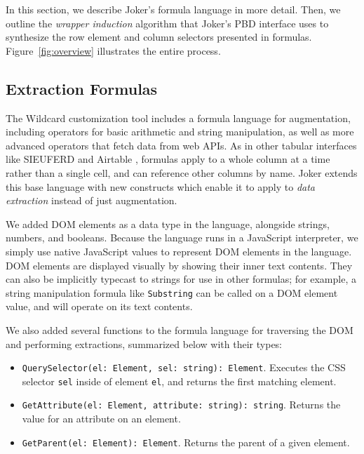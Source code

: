 \documentclass[conference]{IEEEtran}
\providecommand{\tightlist}{%
  \setlength{\itemsep}{0pt}\setlength{\parskip}{0pt}}
\begin{document}
In this section, we describe Joker's formula language in more detail.
Then, we outline the \emph{wrapper induction} \citep{kushmerick2000}
algorithm that Joker's PBD interface uses to synthesize the row element
and column selectors presented in formulas. Figure~\ref{fig:overview}
illustrates the entire process.

\hypertarget{extraction-formulas}{%
\subsection{Extraction Formulas}\label{extraction-formulas}}

The Wildcard customization tool includes a formula language for
augmentation, including operators for basic arithmetic and string
manipulation, as well as more advanced operators that fetch data from
web APIs. As in other tabular interfaces like SIEUFERD \citep{bakke2016}
and Airtable \citep{2021f}, formulas apply to a whole column at a time
rather than a single cell, and can reference other columns by name.
Joker extends this base language with new constructs which enable it to
apply to \emph{data extraction} instead of just augmentation.

We added DOM elements as a data type in the language, alongside strings,
numbers, and booleans. Because the language runs in a JavaScript
interpreter, we simply use native JavaScript values to represent DOM
elements in the language. DOM elements are displayed visually by showing
their inner text contents. They can also be implicitly typecast to
strings for use in other formulas; for example, a string manipulation
formula like \texttt{Substring} can be called on a DOM element value,
and will operate on its text contents.

We also added several functions to the formula language for traversing
the DOM and performing extractions, summarized below with their types:

\begin{itemize}
\tightlist
\item
  \texttt{QuerySelector(el:\ Element,\ sel:\ string):\ Element}.
  Executes the CSS selector \texttt{sel} inside of element \texttt{el},
  and returns the first matching element.
\item
  \texttt{GetAttribute(el:\ Element,\ attribute:\ string):\ string}.
  Returns the value for an attribute on an element.
\item
  \texttt{GetParent(el:\ Element):\ Element}. Returns the parent of a
  given element.
\end{itemize}
\end{document}
